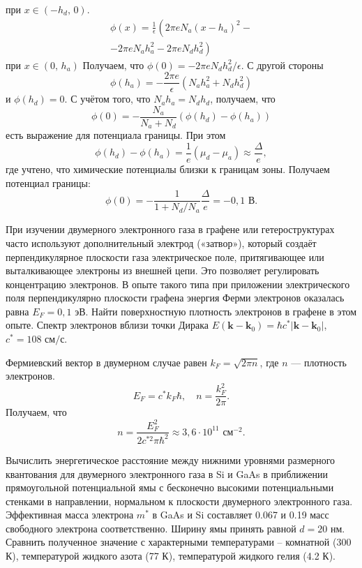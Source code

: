 \documentclass[10pt,landscape,a4paper]{article}
\begin{document}
\begin{multicols*}{5}
\begin{sol}
\[		%
	\] 
	при $x \in \left( -h_d,\,0 \right) $.
	\begin{multline*}
		\phi(x)= \frac{1}{\epsilon }
		\left( 2\pi e N_a \left( x-h_a \right) ^2\right. - \\ - \left.
		2\pi e N_a h_a^2-
	2\pi e N_d h_d^2\right) 
	\end{multline*}
	при $x \in \left( 0,\,h_a \right) $
	Получаем, что $\phi(0)= - 2\pi e N_d h_d^2 /\epsilon $. С другой стороны
\[
	\phi(h_a)= -\frac{2\pi e}{\epsilon }
	\left( N_a h_a^2+N_d h_d^2 \right) 			
\]
и $\phi(h_d)=0$. С учётом того, что
$N_a h_a= N_d h_d$, получаем, что
 \[
	 \phi(0)= -\frac{N_a}{N_a+N_d}\left( 
	 \phi(h_d)-\phi(h_a)\right) 
\]
есть выражение для потенциала границы.
При этом
\[
	\phi \left( h_d \right) -
	\phi\left( h_a \right) =
	\frac{1}{e} \left( \mu_d- \mu_a \right) 
	\approx
	\frac{\Delta}{e}
,\] 
где учтено, что химические потенциалы близки к
границам зоны.
Получаем потенциал границы:
\[
	\phi(0)= - \frac{1}{1+ N_d /N_a}
	\frac{\Delta}{e}= -0,1 \text{ В}
.\] 
\end{sol}
\begin{hiProb}[0-12-1]
При изучении двумерного электронного газа в графене или
гетероструктурах часто используют дополнительный электрод («затвор»),
который создаёт перпендикулярное плоскости газа электрическое поле,
притягивающее или выталкивающее электроны из внешней цепи. Это
позволяет регулировать концентрацию электронов. В опыте такого типа
при приложении электрического поля перпендикулярно плоскости
графена энергия Ферми электронов оказалась равна $E_F=0,1\text{ эВ}$. Найти
поверхностную плотность электронов в графене в этом опыте. Спектр электронов вблизи точки Дирака $E\left( \mathbf{k}-\mathbf{k}_0 \right) =\hbar c^* \left| \mathbf{k}-\mathbf{k}_0 \right| $, $c^*=108 \text{ см} /\text{с}$.
\end{hiProb}
\begin{sol}
Фермиевский вектор в двумерном случае равен $k_F=\sqrt{2\pi n} $, где $n$ --- плотность электронов.
\[
	E_F= c^* k_F \hbar,\quad n= \frac{k_F^2}{2\pi}
.\] 
Получаем, что
 \[
n= \frac{E_F^2}{2c^{*2}\pi\hbar ^2}\approx 3,6\cdot 10^{11}
\text{ см}^{-2}
.\] 
\end{sol}
\begin{hiProb}[0-12-2]
Вычислить энергетическое расстояние между нижними уровнями размерного квантования для двумерного электронного газа в Si и GaAs в приближении прямоугольной потенциальной ямы с бесконечно высокими потенциальными стенками в направлении, нормальном к плоскости двумерного электронного газа. Эффективная масса электрона $m^*$ в GaAs и Si составляет 0.067 и 0.19 масс свободного электрона соответственно. Ширину ямы принять равной $d=20\text{ нм}$. Сравнить полученное значение с характерными температурами – комнатной (300 К), температурой жидкого азота (77 К), температурой жидкого гелия (4.2 К).

\end{hiProb}
\end{multicols*}
\end{document}
